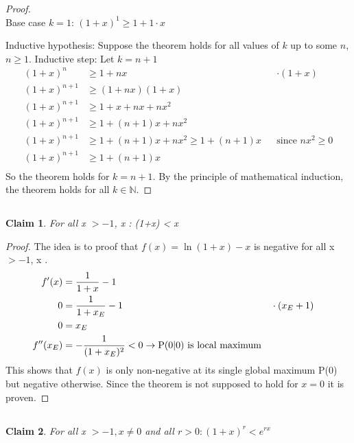 \documentclass[12pt,a4paper]{article}
\newtheorem{claim}{Claim}
\begin{document}
\begin{proof}
\\Base case $k=1$: $(1 + x)^1 \geq 1 + 1 \cdot x$

Inductive hypothesis: Suppose the theorem holds for all values of $k$ up to some $n$, $n \geq 1$.
Inductive step: Let $k=n+1$
\begin{align}
  (1 + x)^n & \geq 1 + nx && \cdot (1 + x)\\
  (1 + x)^{n+1} & \geq (1 + nx)(1+x) \\
  (1 + x)^{n+1} & \geq 1 + x + nx + nx^2 \\
  (1 + x)^{n+1} & \geq 1 + (n+1)x + nx^2 \\
  (1 + x)^{n+1} & \geq 1 + (n+1)x + nx^2 \geq 1 + (n+1)x && \text{since } nx^2 \geq 0\\
  (1 + x)^{n+1} & \geq 1 + (n+1)x \\
\end{align}
So the theorem holds for $k=n+1$.
By the principle of mathematical induction, the theorem holds for all $k \in \mathbb{N}$.
\end{proof}

\subsection{}
\begin{claim}
For all x $>-1$, x : \ln(1+x) < x
\end{claim}

\begin{proof}
The idea is to proof that $f(x)=\ln(1+x)-x$ is negative for all x $>-1$, x . \\

\begin{align}
  f'(x) &= \frac{1}{1+x}-1 \\
  0 &= \frac{1}{1+x_E}-1 && \cdot (x_E + 1) \\
  0 &= x_E \\
  f''(x_E) &= -\frac{1}{(1+x_E)^2} < 0 \rightarrow \text{P(0\textbar 0) is local maximum}\\
\end{align}
This shows that $f(x)$ is only non-negative at its single global maximum P(0) but negative otherwise.
Since the theorem is not supposed to hold for $x=0$ it is proven.
\end{proof}

\clearpage

\subsection{}
\begin{claim}
For all x $>-1, x \neq 0$ and all $r > 0: (1+x)^r < e^{rx}$
\end{claim}
\end{document}
